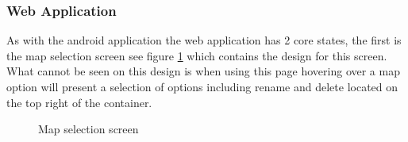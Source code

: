 \subsubsection{Web Application}
As with the android application the web application has 2 core states, the first is the map selection screen see figure \ref{fig:webappmapsel} which contains the design for this screen. What cannot be seen on this design is when using this page hovering over a map option will present a selection of options including rename and delete located on the top right of the container.\\
\begin{figure}[h]
	\centering
	\caption{Map selection screen}
	\label{fig:webappmapsel}
\end{figure}


